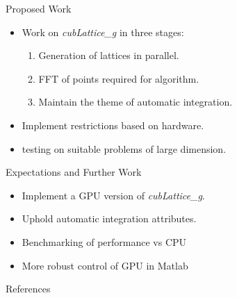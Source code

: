 \documentclass[11pt]{beamer}
\begin{document}
\begin{frame}{Proposed Work}
\begin{itemize}
\item Work on \textit{cubLattice\_g} in three stages:
	\begin{enumerate}
		\item Generation of lattices in parallel.
		\item FFT of points required for algorithm.
		\item Maintain the theme of automatic integration.
	\end{enumerate}
\item Implement restrictions based on hardware.
\item testing on suitable problems of large dimension.
\end{itemize}
\end{frame}

\begin{frame}{Expectations and Further Work}
\begin{itemize}
\item Implement a GPU version of \textit{cubLattice\_g}.
\item Uphold automatic integration attributes.
\item Benchmarking of performance vs CPU
\item More robust control of GPU in Matlab
\end{itemize}
\end{frame}

\begin{frame}{References}


\end{frame}
\end{document}
